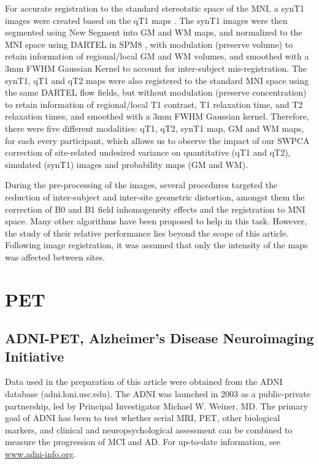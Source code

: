 For accurate registration to the standard stereotatic space of the \ac{MNI}, a \ac{synT1} images were created based on the \ac{qT1} maps \cite{Ecker2013,Ecker2012,Lai2012}. The \ac{synT1} images were then segmented using New Segment into \ac{GM} and \ac{WM} maps, and normalized to the \ac{MNI} space using DARTEL in SPM8 \cite{spm_book}, with modulation (preserve volume) to retain information of regional/local \ac{GM} and \ac{WM} volumes, and smoothed with a 3mm FWHM Gaussian Kernel to account for inter-subject mis-registration. The \ac{synT1}, \ac{qT1} and \ac{qT2} maps were also registered to the standard \ac{MNI} space using the same DARTEL flow fields, but without modulation (preserve concentration) to retain information of regional/local T1 contrast, T1 relaxation time, and T2 relaxation times, and smoothed with a 3mm FWHM Gaussian kernel. Therefore, there were five different modalities: \ac{qT1}, \ac{qT2}, \ac{synT1} map, \ac{GM} and \ac{WM} maps, for each every participant, which allows us to observe the impact of our \ac{SWPCA} correction of site-related undesired variance on quantitative (\ac{qT1} and \ac{qT2}), simulated (\ac{synT1}) images and probability maps (\ac{GM} and \ac{WM}).
	
During the pre-processing of the images, several procedures targeted the reduction of inter-subject and inter-site geometric distortion, amongst them the correction of B0 and B1 field inhomogeneity effects and the registration to \ac{MNI} space. Many other algorithms have been proposed to help in this task. However, the study of their relative performance lies beyond the scope of this article. Following image registration, it was assumed that only the intensity of the maps was affected between sites.

\section{\acs{PET}}
\subsection{ADNI-PET, Alzheimer's Disease Neuroimaging Initiative}\label{sec:adnipet}

Data used in the preparation of this article were obtained from the \acf{ADNI} database (adni.loni.usc.edu). The \ac{ADNI} was launched in 2003 as a public-private partnership, led by Principal Investigator Michael W. Weiner, MD. The primary goal of \ac{ADNI} has been to test whether serial \ac{MRI}, \ac{PET}, other biological markers, and clinical and neuropsychological assessment can be combined to measure the progression of \ac{MCI} and \ac{AD}. For up-to-date information, see \url{www.adni-info.org}.


